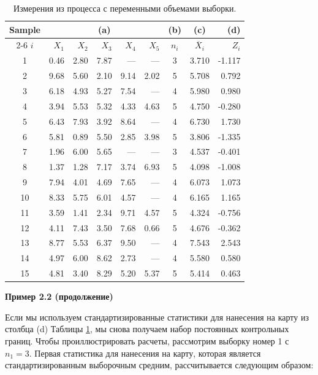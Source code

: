 \begin{table}[htbp]
	\centering
	\caption{Измерения из процесса с переменными объемами выборки.}
	\label{tab:2.4}
	\renewcommand{\arraystretch}{1.1} %
	\begin{tabular}{c *{5}{r} c c r}
		\toprule
		Sample & \multicolumn{5}{c}{(a)} & (b) & (c) & (d) \\
		\cmidrule(lr){2-6}
		\(i\) & \(X_1\) & \(X_2\) & \(X_3\) & \(X_4\) & \(X_5\) & \(n_i\) & \(\overline{X}_i\) & \(Z_i\) \\
		\midrule
		1  & 0.46 & 2.80 & 7.87 & ---   & ---   & 3 & 3.710 & -1.117 \\
		2  & 9.68 & 5.60 & 2.10 & 9.14  & 2.02  & 5 & 5.708 & 0.792  \\
		3  & 6.18 & 4.93 & 5.27 & 7.54  & ---   & 4 & 5.980 & 0.980  \\
		4  & 3.94 & 5.53 & 5.32 & 4.33  & 4.63  & 5 & 4.750 & -0.280 \\
		5  & 6.43 & 7.93 & 3.92 & 8.64  & ---   & 4 & 6.730 & 1.730  \\
		6  & 5.81 & 0.89 & 5.50 & 2.85  & 3.98  & 5 & 3.806 & -1.335 \\
		7  & 1.96 & 6.00 & 5.65 & ---   & ---   & 3 & 4.537 & -0.401 \\
		8  & 1.37 & 1.28 & 7.17 & 3.74  & 6.93  & 5 & 4.098 & -1.008 \\
		9  & 7.94 & 4.01 & 4.69 & 7.65  & ---   & 4 & 6.073 & 1.073  \\
		10 & 8.33 & 5.75 & 6.01 & 4.57  & ---   & 4 & 6.165 & 1.165  \\
		11 & 3.59 & 1.41 & 2.34 & 9.71  & 4.57  & 5 & 4.324 & -0.756 \\
		12 & 4.11 & 7.43 & 3.50 & 7.68  & 0.66  & 5 & 4.676 & -0.362 \\
		13 & 8.77 & 5.53 & 6.37 & 9.50  & ---   & 4 & 7.543 & 2.543  \\
		14 & 4.97 & 6.00 & 8.62 & 2.73  & ---   & 4 & 5.580 & 0.580  \\
		15 & 4.81 & 3.40 & 8.29 & 5.20  & 5.37  & 5 & 5.414 & 0.463  \\
		\bottomrule
	\end{tabular}
\end{table}

\noindent\textbf{Пример 2.2 (продолжение)}

Если мы используем стандартизированные статистики для нанесения на карту из столбца (d) Таблицы \ref{tab:2.4}, мы снова получаем набор постоянных контрольных границ. Чтобы проиллюстрировать расчеты, рассмотрим выборку номер 1 с \(n_1 = 3\). Первая статистика для нанесения на карту, которая является стандартизированным выборочным средним, рассчитывается следующим образом:

